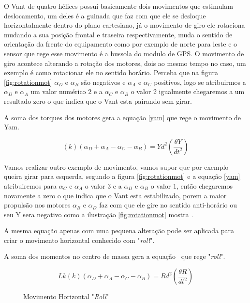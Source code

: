 O Vant de quatro hélices possui basicamente dois movimentos que estimulam deslocamento, um deles é a guinada que faz com que ele se desloque horizontalmente dentro do plano cartesiano, já o movimento de giro ele rotaciona mudando a sua posição frontal e traseira respectivamente, muda o sentido de orientação da frente do equipamento como por exemplo de norte para leste e o sensor que rege esse movimento é a bussola do modulo de GPS. O movimento de giro acontece alterando a rotação dos motores, dois ao mesmo tempo no caso, um exemplo é como rotacionar ele no sentido horário. Perceba que na figura \ref{fig:rotationmot} $\alpha_{D}$ e $\alpha_{B}$ são negativos e $\alpha_{A}$ e $\alpha_{C}$ positivos, logo se atribuirmos a $\alpha_{D}$ e $\alpha_{A}$ um valor numérico 2 e a $\alpha_{C}$ e $\alpha_{B}$ o valor 2 igualmente chegaremos a um resultado zero o que indica que o Vant esta pairando sem girar.  

A soma dos torques dos motores gera a equação \ref{yam} que rege o movimento de Yam. 

\begin{equation}
    \label{yam}
    \left(k\right)\left(\alpha_{D}+\alpha_{A}-\alpha_{C}-\alpha_{B}\right)=Yd^2\left(\frac{\theta Y}{dt^2}\right)
\end{equation}

Vamos realizar outro exemplo de movimento, vamos supor que por exemplo queira girar para esquerda, segundo a figura \ref{fig:rotationmot} e a equação \ref{yam} atribuiremos para $\alpha_{C}$ e $\alpha_{A}$ o valor 3 e a $\alpha_{D}$ e $\alpha_{B}$ o valor 1, então chegaremos novamente a zero o que indica que o Vant esta estabilizado, porem a maior propulsão nos motores $\alpha_{B}$ e $\alpha_{D}$ faz com que ele gire no sentido anti-horário ou seu Y sera negativo como a ilustração \ref{fig:rotationmot} mostra \cite{momesf}.

A mesma equação apenas com uma pequena alteração pode ser aplicada para criar o movimento horizontal conhecido com "\textit{roll}". 

A soma dos momentos no centro de massa gera a equação \ que rege "\textit{roll}". 

\begin{equation}
    \label{roll}
    Lk\left(k\right)\left(\alpha_{D}+\alpha_{A}-\alpha_{C}-\alpha_{B}\right)=Rd^2\left(\frac{\theta R}{dt^2}\right)
\end{equation}

\begin{figure}[H]
	\centering
	\caption{Movimento Horizontal "\textit{Roll}"}
		\fontsize{9pt}{12pt}\selectfont
	\def\svgwidth{15cm}
	
	\label{fig:roll}
\end{figure}

